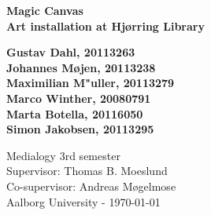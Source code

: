 \thispagestyle{empty} %
\hspace{6cm} \vspace{6cm}
\begin{center}
\textbf{\Huge {Magic Canvas}\\ \vspace{1cm}
\huge{Art installation at Hj{\o}rring Library}}
\end{center}
\vspace{1cm}
\begin{center}
\Large{\textbf{Gustav Dahl, 20113263 \\ Johannes M{\o}jen, 20113238
\\ Maximilian M"uller, 20113279 \\ Marco Winther, 20080791 \\ Marta Botella, 20116050
\\ Simon Jakobsen, 20113295}}
\end{center}
\vfill
Medialogy 3rd semester\\
Supervisor: Thomas B. Moeslund\\
Co-supervisor: Andreas M{\o}gelmose\\
Aalborg University - \today
\thispagestyle{empty}
\setcounter{page}{0}